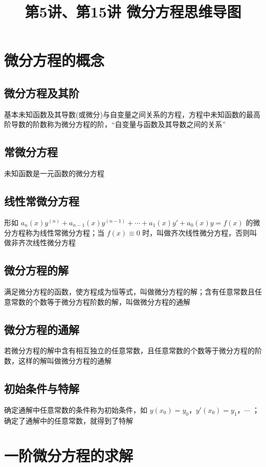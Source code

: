 \documentclass[UTF8]{ctexart}
\title{第5讲、第15讲 微分方程思维导图}
\author{}
\date{}
\theoremstyle{remark}
\begin{document}
	\maketitle
	
	\section{微分方程的概念}
	\subsection{微分方程及其阶}
	基本未知函数及其导数(或微分)与自变量之间关系的方程，方程中未知函数的最高阶导数的阶数称为微分方程的阶，“自变量与函数及其导数之间的关系”
	
	\subsection{常微分方程}
	未知函数是一元函数的微分方程
	
	\subsection{线性常微分方程}
	形如 \(a_n(x)y^{(n)} + a_{n - 1}(x)y^{(n - 1)} + \cdots + a_1(x)y' + a_0(x)y = f(x)\) 的微分方程称为线性常微分方程；当 \(f(x) \equiv 0\) 时，叫做齐次线性微分方程，否则叫做非齐次线性微分方程
	
	\subsection{微分方程的解}
	满足微分方程的函数，使方程成为恒等式，叫做微分方程的解；含有任意常数且任意常数的个数等于微分方程阶数的解，叫做微分方程的通解
	
	\subsection{微分方程的通解}
	若微分方程的解中含有相互独立的任意常数，且任意常数的个数等于微分方程的阶数，这样的解叫做微分方程的通解
	
	\subsection{初始条件与特解}
	确定通解中任意常数的条件称为初始条件，如 \(y(x_0) = y_0\)，\(y'(x_0) = y_1\)，\(\cdots\) ；确定了通解中的任意常数，就得到了特解
	
	\section{一阶微分方程的求解}
\end{document}

